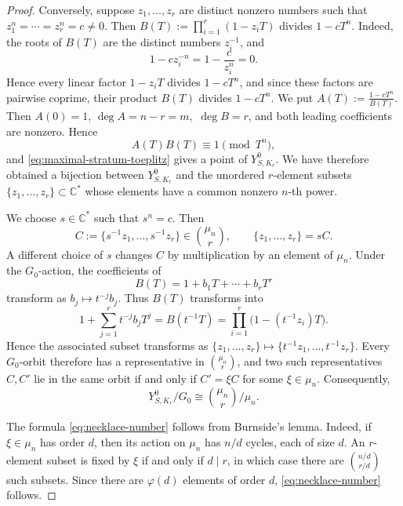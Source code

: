\documentclass[12pt, reqno]{amsart}
\theoremstyle{plain}
\numberwithin{equation}{section}
\theoremstyle{definition}
\begin{document}
\begin{proof}
Conversely, suppose \(z_1,\ldots,z_r\) are distinct nonzero numbers
such that $z_1^n=\cdots=z_r^n=c\neq0.$
Then $B(T):=\prod_{i=1}^r(1-z_iT)$
divides \(1-cT^n\). Indeed, the roots of \(B(T)\) are the distinct numbers \(z_i^{-1}\),
and
\[
1-cz_i^{-n}=1-\frac{c}{z_i^n}=0.
\]
Hence every linear factor \(1-z_iT\) divides \(1-cT^n\), and since
these factors are pairwise coprime, their product \(B(T)\) divides
\(1-cT^n\). We put $A(T):=\frac{1-cT^n}{B(T)}.$
Then \(A(0)=1\), $\deg A=n-r=m,$ $\deg B=r$, and both leading coefficients are nonzero. Hence
\[
A(T)B(T)\equiv1\pmod{T^n},
\]
and \eqref{eq:maximal-stratum-toeplitz} gives a point of
\(Y^0_{S,K_r}\). We have therefore obtained a bijection between
\(Y^0_{S,K_r}\) and the unordered \(r\)-element subsets $\{z_1,\ldots,z_r\}\subset\mathbb C^*$
whose elements have a common nonzero \(n\)-th power.

We choose \(s\in\mathbb C^*\)
such that \(s^n=c\). Then
\[
C:=\{s^{-1}z_1,\ldots,s^{-1}z_r\}
\in\binom{\mu_n}{r},
\qquad
\{z_1,\ldots,z_r\}=sC.
\]
A different choice of \(s\) changes \(C\) by multiplication by an
element of \(\mu_n\). Under the \(G_0\)-action, the coefficients of
\[
B(T)=1+b_1T+\cdots+b_rT^r
\]
transform as \(b_j\mapsto t^{-j}b_j\). Thus \(B(T)\) transforms into
\[
1+\sum_{j=1}^r t^{-j}b_jT^j
=
B(t^{-1}T)
=
\prod_{i=1}^r\bigl(1-(t^{-1}z_i)T\bigr).
\]
Hence the associated subset transforms as $\{z_1,\ldots,z_r\}
\longmapsto
\{t^{-1}z_1,\ldots,t^{-1}z_r\}.$
Every \(G_0\)-orbit therefore has a representative in
\(\binom{\mu_n}{r}\), and two such representatives \(C,C'\) lie in
the same orbit if and only if $C'=\xi C$ for some $\xi\in\mu_n.$
Consequently,
\[
Y^0_{S,K_r}/G_0
\cong
\binom{\mu_n}{r}/\mu_n.
\]



The formula \eqref{eq:necklace-number} follows from Burnside's lemma.
Indeed, if \(\xi\in\mu_n\) has order \(d\), then its action on
\(\mu_n\) has \(n/d\) cycles, each of size \(d\). An \(r\)-element
subset is fixed by \(\xi\) if and only if \(d\mid r\), in which case
there are $\binom{n/d}{r/d}$
such subsets. Since there are \(\varphi(d)\) elements of order \(d\),
\eqref{eq:necklace-number} follows.


\end{proof}
\end{document}
